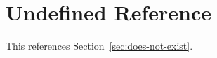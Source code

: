 \documentclass{article}
\begin{document}
\section{Undefined Reference}
This references Section~\ref{sec:does-not-exist}.
\end{document}
